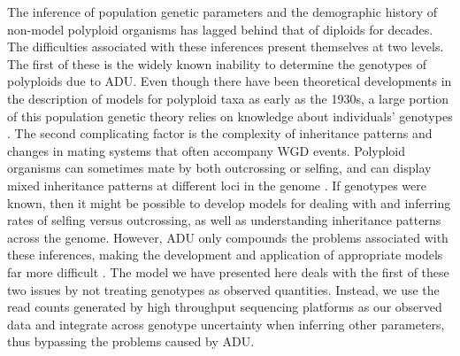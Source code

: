 \documentclass[11pt,english,letterpaper,oneside]{article}
\begin{document}
The inference of population genetic parameters and the demographic history of non-model polyploid organisms has lagged behind that of diploids for decades. The difficulties associated with these inferences present themselves at two levels. The first of these is the widely known inability to determine the genotypes of polyploids due to ADU. Even though there have been theoretical developments in the description of models for polyploid taxa as early as the 1930s, a large portion of this population genetic theory relies on knowledge about individuals' genotypes \citep[e.g.,][]{haldane1930autopolyploids,wright1938polyploid}. The second complicating factor is the complexity of inheritance patterns and changes in mating systems that often accompany WGD events. Polyploid organisms can sometimes mate by both outcrossing or selfing, and can display mixed inheritance patterns at different loci in the genome \citep{dufresne2014polyPopGen}. If genotypes were known, then it might be possible to develop models for dealing with and inferring rates of selfing versus outcrossing, as well as understanding inheritance patterns across the genome. However, ADU only compounds the problems associated with these inferences, making the development and application of appropriate models far more difficult \citep[but see list of software in][]{dufresne2014polyPopGen}. The model we have presented here deals with the first of these two issues by not treating genotypes as observed quantities. Instead, we use the read counts generated by high throughput sequencing platforms as our observed data and integrate across genotype uncertainty when inferring other parameters, thus bypassing the problems caused by ADU.
\medskip
\end{document}
